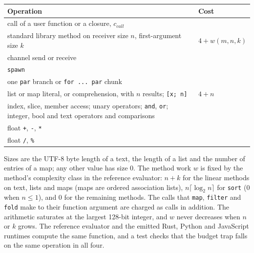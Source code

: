 \documentclass[10pt,letterpaper]{article}
\newcounter{none}
\begin{document}
{\def\LTcaptype{none} %
{\footnotesize\setlength{\tabcolsep}{3.8pt}\renewcommand{\arraystretch}{1.15}
\begin{longtable}[]{@{}
  >{\raggedright\arraybackslash}p{}
  >{\raggedright\arraybackslash}p{}@{}}
\toprule\noalign{}
\begin{minipage}[b]{\linewidth}\raggedright
\textbf{Operation}
\end{minipage} & \begin{minipage}[b]{\linewidth}\raggedright
\textbf{Cost}
\end{minipage} \\
\midrule\noalign{}
\endhead
\bottomrule\noalign{}
\endlastfoot
call of a user function or a closure, \(c_{call}\) & 4 \\
standard library method on receiver size \(n\), first-argument size
\(k\) & \(4 + w(m, n, k)\) \\
channel send or receive & 8 \\
\texttt{spawn} & 32 \\
one \texttt{par} branch or \texttt{for\ ...\ par} chunk & 16 \\
list or map literal, or comprehension, with \(n\) results;
\texttt{{[}x;\ n{]}} & \(4 + n\) \\
index, slice, member access; unary operators; \texttt{and}, \texttt{or};
integer, bool and text operators and comparisons & 1 \\
float \texttt{+}, \texttt{-}, \texttt{*} & 2 \\
float \texttt{/}, \texttt{\%} & 8 \\
\end{longtable}
}
}

Sizes are the UTF-8 byte length of a text, the length of a list and the
number of entries of a map; any other value has size 0. The method work
\(w\) is fixed by the method's complexity class in the reference
evaluator: \(n + k\) for the linear methods on text, lists and maps
(maps are ordered association lists), \(n \lceil \log_2 n \rceil\) for
\texttt{sort} (0 when \(n \le 1\)), and 0 for the remaining methods. The
calls that \texttt{map}, \texttt{filter} and \texttt{fold} make to their
function argument are charged as calls in addition. The arithmetic
saturates at the largest 128-bit integer, and \(w\) never decreases when
\(n\) or \(k\) grows. The reference evaluator and the emitted Rust,
Python and JavaScript runtimes compute the same function, and a test
checks that the budget trap falls on the same operation in all four.
\end{document}
